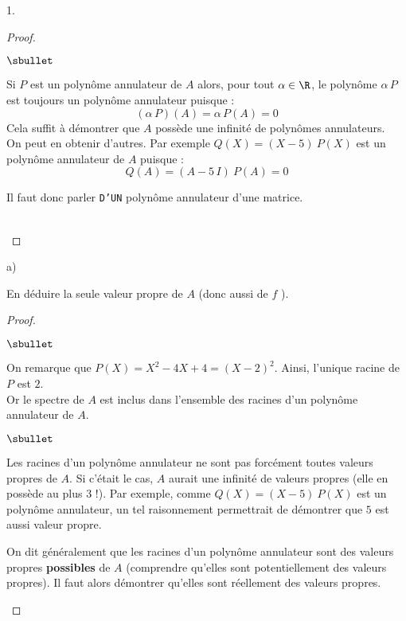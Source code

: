 \begin{noliste}{1.}
\begin{proof}
\begin{remark}
\begin{noliste}{$\sbullet$}
      \item Si $P$ est un polynôme annulateur de $A$ alors, pour tout
        $\alpha \in \R$, le polynôme $\alpha \, P$ est toujours un
        polynôme annulateur puisque :
        \[
        (\alpha \, P)(A) = \alpha \, P(A) = 0
        \]
        Cela suffit à démontrer que $A$ possède une infinité de
        polynômes annulateurs. \\
        On peut en obtenir d'autres. Par exemple $Q(X) = (X-5) \ P(X)$
        est un polynôme annulateur de $A$ puisque :
        \[
        Q(A) = (A - 5 \, I) \ P(A) = 0
        \]
      \item Il faut donc parler {\tt D'UN} polynôme annulateur d'une
        matrice.
      \end{noliste}
    \end{remark}    
    ~\\[-1.2cm]
  \end{proof}

\item
  \begin{noliste}{a)}
    \setlength{\itemsep}{2mm}
  \item En déduire la seule valeur propre de $A$ (donc aussi de $f$ ).

    \begin{proof}~
      \begin{noliste}{$\sbullet$}
      \item On remarque que $P(X) = X^2 -4X +4 = (X-2)^2$. Ainsi,
        l'unique racine de $P$ est $2$.\\
        Or le spectre de $A$ est inclus dans l'ensemble des racines
        d'un polynôme annulateur de $A$.%


        \newpage


        \begin{remark}%
          \begin{noliste}{$\sbullet$}
          \item Les racines d'un polynôme annulateur ne sont pas
            forcément toutes valeurs propres de $A$. Si c'était le
            cas, $A$ aurait une infinité de valeurs propres (elle en
            possède au plus $3$ !). Par exemple, comme $Q(X) = (X-5) \
            P(X)$ est un polynôme annulateur, un tel raisonnement
            permettrait de démontrer que $5$ est aussi valeur propre.

          \item On dit généralement que les racines d'un polynôme
            annulateur sont des valeurs propres {\bf possibles} de $A$
            (comprendre qu'elles sont potentiellement des valeurs
            propres). Il faut alors démontrer qu'elles sont
            réellement des valeurs propres.
          \end{noliste}
        \end{remark}


\end{noliste}
\end{proof}
\end{noliste}
\end{noliste}

